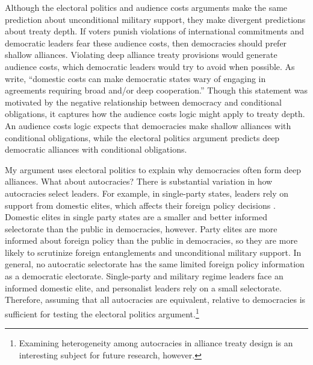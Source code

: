 \documentclass[12pt]{article}
\begin{document}
Although the electoral politics and audience costs arguments make the same prediction about unconditional military support, they make divergent predictions about treaty depth. 
If voters punish violations of international commitments and democratic leaders fear these audience costs, then democracies should prefer shallow alliances.
Violating deep alliance treaty provisions would generate audience costs, which democratic leaders would try to avoid when possible.
As \citet[pg. 980]{Chibaetal2015} write, ``domestic costs can make democratic states wary of engaging in agreements requiring broad and/or deep cooperation.''  
Though this statement was motivated by the negative relationship between democracy and conditional obligations, it captures how the audience costs logic might apply to treaty depth. 
An audience costs logic expects that democracies make shallow alliances with conditional obligations, while the electoral politics argument predicts deep democratic alliances with conditional obligations. 


My argument uses electoral politics to explain why democracies often form deep alliances. 
What about autocracies? 
There is substantial variation in how autocracies select leaders. 
For example, in single-party states, leaders rely on support from domestic elites, which affects their foreign policy decisions \citep{Weeks2014}.
Domestic elites in single party states are a smaller and better informed selectorate than the public in democracies, however.  
Party elites are more informed about foreign policy than the public in democracies, so they are more likely to scrutinize foreign entanglements and unconditional military support. 
In general, no autocratic selectorate has the same limited foreign policy information as a democratic electorate.
Single-party and military regime leaders face an informed domestic elite, and personalist leaders rely on a small selectorate. 
Therefore, assuming that all autocracies are equivalent, relative to democracies is sufficient for testing the electoral politics argument.\footnote{Examining heterogeneity among autocracies in alliance treaty design is an interesting subject for future research, however.} 
\end{document}
